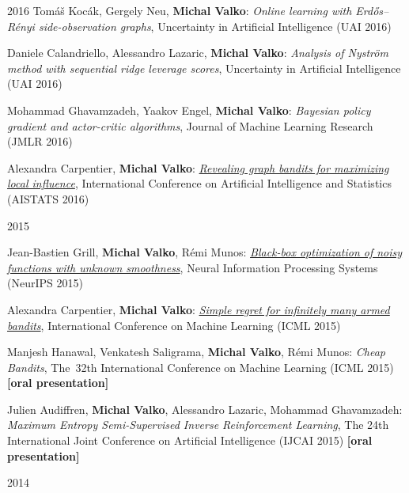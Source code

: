 \documentclass{resume}
\begin{document}
\begin{category}{2016}
\citembullet
Tom\'a\v s Koc\' ak, Gergely Neu, {\bf Michal Valko}:
\emph{ Online learning with Erd\H os--R\'enyi side-observation graphs},
Uncertainty in Artificial Intelligence
({\sf UAI 2016}) 

\citembullet
Daniele Calandriello, Alessandro Lazaric, {\bf Michal Valko}:
\emph{Analysis of Nystr{\"o}m method with sequential ridge leverage scores},
Uncertainty in Artificial Intelligence
({\sf UAI 2016}) 

\citembullet
Mohammad Ghavamzadeh, Yaakov Engel, {\bf Michal Valko}:
\emph{Bayesian policy gradient and actor-critic algorithms},
Journal of Machine Learning Research
({\sf JMLR 2016}) 


\citembullet
Alexandra Carpentier, {\bf Michal Valko}:
\href{http://researchers.lille.inria.fr/~valko/hp/serve.php?what=publications/carpentier2016revealing.pdf}
{\emph{Revealing graph bandits for maximizing local influence}},
International Conference on Artificial Intelligence and Statistics
({\sf AISTATS 2016}) 

\end{category}\begin{category}{2015}

\citembullet
Jean-Bastien Grill, {\bf Michal Valko}, R\' emi Munos:
\href{http://researchers.lille.inria.fr/~valko/hp/serve.php?what=publications/grill2015black-box.pdf}
{\emph{Black-box optimization of noisy functions with unknown smoothness}},
Neural Information Processing Systems
({\sf NeurIPS 2015}) 

\citembullet
Alexandra Carpentier, {\bf Michal Valko}:
\href{http://researchers.lille.inria.fr/~valko/hp/serve.php?what=publications/carpentier2015simple.pdf}
{\emph{Simple regret for infinitely many armed bandits}},
International Conference on Machine Learning
({\sf ICML 2015}) 


\citembullet
Manjesh Hanawal, Venkatesh Saligrama, {\bf Michal Valko},  R\' emi Munos:
\emph{Cheap Bandits},
The~32th International Conference on Machine Learning
({\sf ICML 2015}) {\bf [oral presentation]}

\citembullet
Julien Audiffren, {\bf Michal Valko},  Alessandro Lazaric, Mohammad Ghavamzadeh:
\emph{Maximum Entropy Semi-Supervised Inverse Reinforcement Learning},
 The 24th International Joint Conference on Artificial Intelligence
({\sf IJCAI 2015}) {\bf [oral presentation]}

\end{category}\begin{category}{2014}


\end{category}
\end{document}

